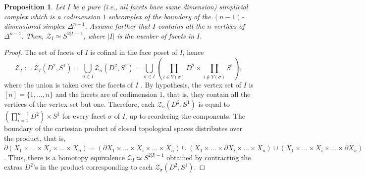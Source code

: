 \documentclass[a4paper,11pt]{article}
\newtheorem{proposition}[theorem]{Proposition}
\theoremstyle{definition}
\newcommand{\ZZ}{\mathcal{Z}}
\begin{document}
\begin{proposition}\label{prop-pute-boundary-momentangle}
Let $I$ be a pure (i.e., all facets have same dimension) simplicial complex which is a codimension $1$ subcomplex of the boundary of the $(n-1)$-dimensional simplex $\Delta^{n-1}$. Assume further that $I$ contains all the $n$ vertices of $\Delta^{n-1}$. Then, $\ZZ_I \simeq S^{2|I|-1}$, where $|I|$ is the number of facets in $I$.
\end{proposition}
\begin{proof}
	The set of facets of $I$ is cofinal in the face poset of $I$, hence \[\ZZ_I := \ZZ_{I}(D^2,S^1)= \bigcup_{\sigma \in I} \ZZ_\sigma(D^2,S^1) = \bigcup_{\sigma \in I} (\prod_{i \in V(\sigma)} D^2 \times \prod_{i \not \in V(\sigma)} S^1),\] where the union is taken over the facets of $I$ \cite[Lemma~2.1]{shifted-GRBIC20136}. By hypothesis, the vertex set of $I$ is $[n] = \{1, \ldots, n\}$ and the facets are of codimension $1$, that is, they contain all the vertices of the vertex set but one.
	Therefore, each $\ZZ_\sigma(D^2,S^1)$ is equal to $(\prod_{i = 1}^{n-1} D^2)\times S^1$ for every facet $\sigma$ of $I$, up to reordering the components. The boundary of the cartesian product of closed topological spaces distributes over the product, that is, $\partial (X_1 \times \ldots \times X_i \times \ldots \times X_n) =  (\partial X_1 \times \ldots \times X_i \times \ldots \times X_n) \cup (X_1 \times \ldots \times \partial X_i \times \ldots \times X_n) \cup (X_1 \times \ldots \times X_i \times \ldots \times \partial X_n)$. Thus, there is a homotopy equivalence $\ZZ_I \simeq S^{2|I|-1}$ obtained by contracting the extras $D^2$'s in the product corresponding to each $\ZZ_\sigma(D^2,S^1)$.
\end{proof}
\end{document}
